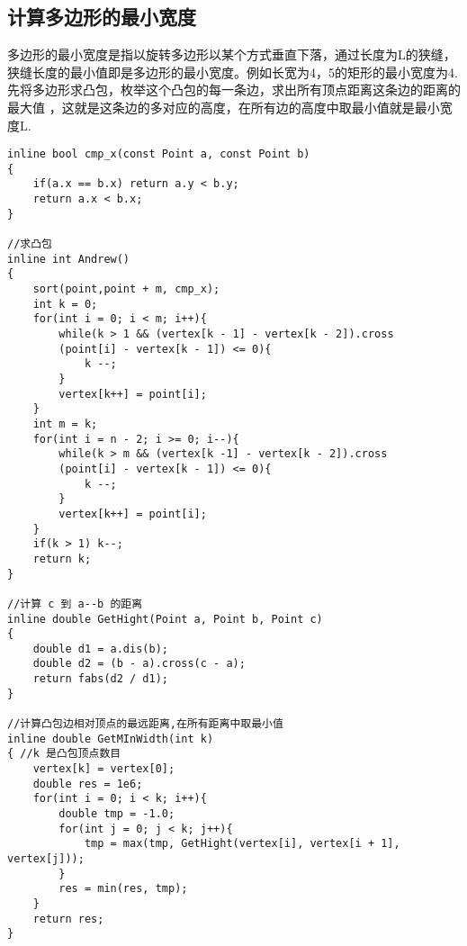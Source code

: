 \subsection{计算多边形的最小宽度}
多边形的最小宽度是指以旋转多边形以某个方式垂直下落，通过长度为L的狭缝，狭缝长度的最小值即是多边形的最小宽度。例如长宽为4，5的矩形的最小宽度为4.\\
先将多边形求凸包，枚举这个凸包的每一条边，求出所有顶点距离这条边的距离的最大值 ，这就是这条边的多对应的高度，在所有边的高度中取最小值就是最小宽度L.
\begin{lstlisting}
inline bool cmp_x(const Point a, const Point b)
{
    if(a.x == b.x) return a.y < b.y;
    return a.x < b.x;
}

//求凸包
inline int Andrew()
{
    sort(point,point + m, cmp_x);
    int k = 0;
    for(int i = 0; i < m; i++){
        while(k > 1 && (vertex[k - 1] - vertex[k - 2]).cross
        (point[i] - vertex[k - 1]) <= 0){
            k --;
        }
        vertex[k++] = point[i];
    }
    int m = k;
    for(int i = n - 2; i >= 0; i--){
        while(k > m && (vertex[k -1] - vertex[k - 2]).cross
        (point[i] - vertex[k - 1]) <= 0){
            k --;
        }
        vertex[k++] = point[i];
    }
    if(k > 1) k--;
    return k;
}

//计算 c 到 a--b 的距离
inline double GetHight(Point a, Point b, Point c)
{
    double d1 = a.dis(b);
    double d2 = (b - a).cross(c - a);
    return fabs(d2 / d1);
}

//计算凸包边相对顶点的最远距离,在所有距离中取最小值
inline double GetMInWidth(int k)
{ //k 是凸包顶点数目
    vertex[k] = vertex[0];
    double res = 1e6;
    for(int i = 0; i < k; i++){
        double tmp = -1.0;
        for(int j = 0; j < k; j++){
            tmp = max(tmp, GetHight(vertex[i], vertex[i + 1], vertex[j]));
        }
        res = min(res, tmp);
    }
    return res;
}
\end{lstlisting}

